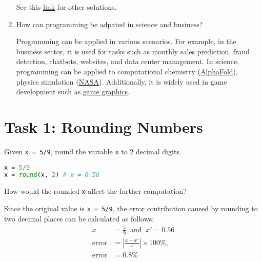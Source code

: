 \documentclass[11pt]{article}
\begin{document}
\begin{enumerate}
{\begin{tcolorbox}[colback=black!10!white, colframe=black!75!white, title=\textbf{Answer}]
            \par
            See this \href{https://www.geeksforgeeks.org/overflowerror-convert-int-large-to-float-in-python/}{link} for other solutions.
        \end{tcolorbox}
    }
    \item {
        How can programming be adpated in science and business?  
        \begin{tcolorbox}[colback=black!10!white, colframe=black!75!white, title=\textbf{Answer}]
            Programming can be applied in various scenarios. 
            For example, in the business sector, it is used for tasks such as monthly sales prediction, fraud detection, chatbots, websites, and data center management. 
            In science, programming can be applied to computational chemistry (\href{https://youtu.be/7q8Uw3rmXyE?si=auYcRjVZkxvq_BN5}{AlphaFold}), physics simulation (\href{https://youtu.be/kRlhlCWplqk?si=skcE9BLBjUz8EkEO}{NASA}).
            Additionally, it is widely used in game development such as \href{https://youtu.be/C8YtdC8mxTU?si=wq3iSpSbeevr7HIx}{game graphics}.
        \end{tcolorbox}
    }
\end{enumerate}

\clearpage

\section*{Task 1: Rounding Numbers}
Given \texttt{x = 5/9}, round the variable \texttt{x} to 2 decimal digits.

\begin{lstlisting}[language=Python]
x = 5/9
x = round(x, 2) # x = 0.56 
\end{lstlisting}    

How would the rounded \texttt{x} affect the further computation?
\begin{tcolorbox}[colback=black!10!white, colframe=black!75!white, title=\textbf{Answer}]
    Since the original value is \texttt{x = 5/9}, the error contribution caused by rounding to two decimal places can be calculated as follows:
    \[
        \begin{aligned}
            x &= \frac{5}{9} \ \text{ and } \ x' = 0.56 \\
            \text{error} &= \left| \frac{x - x'}{x} \right| \times 100\%, \\
            \text{error} &= 0.8 \%
        \end{aligned}
    \]
\end{tcolorbox}
\end{document}

